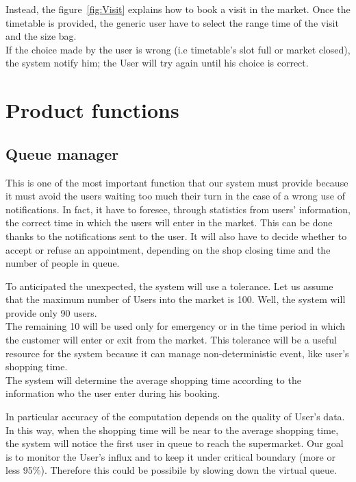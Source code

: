 \par 
\medskip

Instead, the figure~\ref{fig:Visit} explains how to book a visit in the market. Once the timetable is provided, the generic user have to select the range time of the visit and the size bag.
\\
If the choice made by the user is wrong (i.e timetable's slot full or market closed), the system notify him; the User will try again until his choice is correct.
\par 
\medskip


\section{Product functions}
\subsection{Queue manager}
This is one of the most important function that our system must provide because it must avoid the users waiting too much their turn in the case of a wrong use of notifications. 
In fact, it have to foresee, through statistics from users’ information, the correct time in which the users will enter in the market. This can be done thanks to the notifications sent to the user.
It will also have to decide whether to accept or refuse an appointment, depending on the shop closing time and the number of people in queue. 



To anticipated the unexpected, the system will use a tolerance.
Let us assume that the maximum number of Users into the market is 100. Well, the system will provide only 90 users.
\\
The remaining 10 will be used only for emergency or in the time period in which the customer will enter or exit from the market.
This tolerance will be a useful resource for the system because it can manage non-deterministic event, like user's shopping time.
\\%
The system will determine the average shopping time according to the information who the user enter during his booking.
\par
In particular accuracy of the computation depends on the quality of User's data.
In this way, when the shopping time will be near to the average shopping time, the system will notice the first user in queue to reach the supermarket.  
Our goal is to monitor the User's influx and to keep it under critical boundary (more or less 95\%). Therefore this could be possibile by slowing down the virtual queue.
\par
